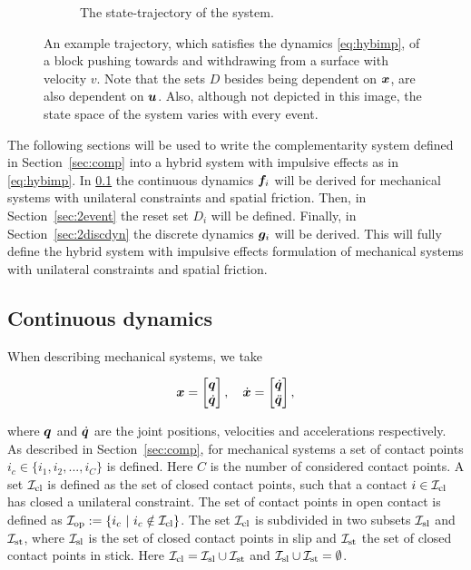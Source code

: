\documentclass[../DC2017114Bouma.tex]{subfiles}
\begin{document}
\begin{figure}[h]
\begin{subfigure}[b]{\textwidth}
\caption{The state-trajectory of the system.}
\label{fig:2exampletraj}
\end{subfigure}
\caption{An example trajectory, which satisfies the dynamics \eqref{eq:hybimp}, of a block pushing towards and withdrawing from a surface with velocity $v$.  Note that the sets $D$ besides being dependent on ${\boldsymbol{x}}$, are also dependent on ${\boldsymbol{u}}$. Also, although not depicted in this image, the state space of the system varies with every event.}
\label{fig:2example}
\end{figure}

The following sections will be used to write the complementarity system defined in Section~\ref{sec:comp} into a hybrid system with impulsive effects as in \eqref{eq:hybimp}. In \ref{sec:2contdyn} the continuous dynamics ${\boldsymbol{f}}_i$ will be derived for mechanical systems with unilateral constraints and spatial friction. Then, in Section~\ref{sec:2event} the reset set $D_i$ will be defined. Finally, in Section~\ref{sec:2discdyn} the discrete dynamics ${\boldsymbol{g}}_i$ will be derived. This will fully define the hybrid system with impulsive effects formulation of mechanical systems with unilateral constraints and spatial friction.

\subsection{Continuous dynamics}\label{sec:2contdyn}
When describing mechanical systems, we take 

\begin{align}
{\boldsymbol{x}} = \begin{bmatrix}
{\boldsymbol{q}}\\ \dot{{\boldsymbol{q}}}
\end{bmatrix},\quad
\dot{{\boldsymbol{x}}} = \begin{bmatrix}
\dot{{\boldsymbol{q}}}\\ \ddot{{\boldsymbol{q}}}
\end{bmatrix},
\end{align}

where ${\boldsymbol{q}}$ and $\dot{{\boldsymbol{q}}}$ are the joint positions, velocities and accelerations respectively. As described in Section~\ref{sec:comp}, for mechanical systems a set of contact points $i_c\in\{i_1,i_2,...,i_C\}$ is defined. Here $C$ is the number of considered contact points. A set $\mathcal{I}_{\text{cl}}$ is defined as the set of closed contact points, such that a contact $i\in\mathcal{I}_{\text{cl}}$ has closed a unilateral constraint. The set of contact points in open contact is defined as $\Ic_{\text{op}} := \{i_c\ |\ i_c\notin\Ic_{\text{cl}}\}$. The set $\mathcal{I}_{\text{cl}}$ is subdivided in two subsets $\mathcal{I}_{\text{sl}}$ and $\mathcal{I}_{\text{st}}$, where $\mathcal{I}_{\text{sl}}$ is the set of closed contact points in slip and $\mathcal{I}_{\text{st}}$ the set of closed contact points in stick. Here $\mathcal{I}_{\text{cl}} =\mathcal{I}_{\text{sl}}\cup\mathcal{I}_{\text{st}}$ and $\mathcal{I}_{\text{sl}}\cup\mathcal{I}_{\text{st}}=\emptyset$. 
\end{document}
